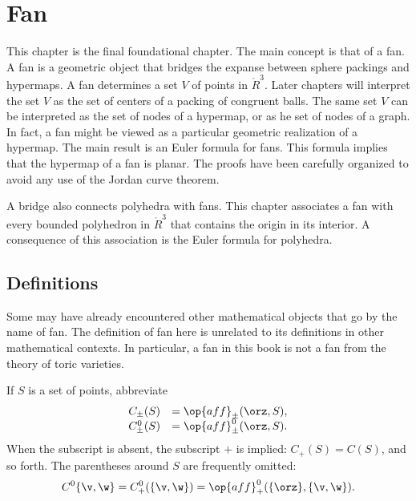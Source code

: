 
\chapter{Fan}\label{sec:fan}




\begin{summary}
This chapter is the final foundational chapter.  The main concept is that of a fan.
A fan is a geometric object that bridges the expanse between sphere packings and hypermaps.  A fan determines a set $V$ of points in $\ring{R}^3$.  Later chapters will interpret the set $V$ as the set of centers of a packing of congruent balls.   The same set $V$ can be interpreted as the set of nodes of a hypermap, or as he set of nodes of a graph.  In fact, a fan might be viewed as  a particular geometric realization of a hypermap.    The main result  is an Euler formula for fans.  This formula  implies that the hypermap of a fan is planar.  The proofs have been carefully organized to avoid any use of the Jordan curve theorem.


A bridge  also connects polyhedra with fans.  This chapter associates a fan with every bounded polyhedron in $\ring{R}^3$ that contains the origin in its interior.  A consequence of this association is the Euler formula for polyhedra.
\end{summary}


%
%
%
%
%

\section{Definitions}



\begin{remark}
Some may have already encountered other mathematical objects that go by the name of fan.
The definition of fan here is unrelated to its definitions in other mathematical contexts.   In particular, a fan in this book is not a fan from the theory of toric varieties.
\end{remark}



If $S$ is a set of points,
abbreviate
  $$
  \begin{array}{lll}
  C_\pm(S) &= \op{aff}_\pm(\orz,S),\\
  C^0_\pm(S) &= \op{aff}^0_\pm(\orz,S).\\
  \end{array}
  $$
When the subscript is absent, the subscript $+$ is implied: $C_+(S) = C(S)$, and
so forth.  The parentheses around $S$ are frequently omitted: 
$$C^0\{\v,\w\}=C^0_+(\{\v,\w\}) = \op{aff}^0_+(\{\orz\},\{\v,\w\}).$$

